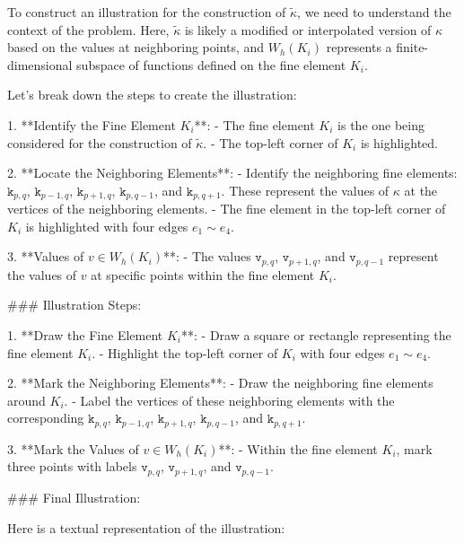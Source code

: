 To construct an illustration for the construction of \(\tilde{\kappa}\), we need to understand the context of the problem. Here, \(\tilde{\kappa}\) is likely a modified or interpolated version of \(\kappa\) based on the values at neighboring points, and \(W_h(K_i)\) represents a finite-dimensional subspace of functions defined on the fine element \(K_i\).

Let's break down the steps to create the illustration:

1. **Identify the Fine Element \(K_i\)**:
   - The fine element \(K_i\) is the one being considered for the construction of \(\tilde{\kappa}\).
   - The top-left corner of \(K_i\) is highlighted.

2. **Locate the Neighboring Elements**:
   - Identify the neighboring fine elements: \(\mathtt{k}_{p,q}\), \(\mathtt{k}_{p-1,q}\), \(\mathtt{k}_{p+1,q}\), \(\mathtt{k}_{p,q-1}\), and \(\mathtt{k}_{p,q+1}\). These represent the values of \(\kappa\) at the vertices of the neighboring elements.
   - The fine element in the top-left corner of \(K_i\) is highlighted with four edges \(e_1 \sim e_4\).

3. **Values of \(v \in W_h(K_i)\)**:
   - The values \(\mathtt{v}_{p,q}\), \(\mathtt{v}_{p+1,q}\), and \(\mathtt{v}_{p,q-1}\) represent the values of \(v\) at specific points within the fine element \(K_i\).

### Illustration Steps:

1. **Draw the Fine Element \(K_i\)**:
   - Draw a square or rectangle representing the fine element \(K_i\).
   - Highlight the top-left corner of \(K_i\) with four edges \(e_1 \sim e_4\).

2. **Mark the Neighboring Elements**:
   - Draw the neighboring fine elements around \(K_i\).
   - Label the vertices of these neighboring elements with the corresponding \(\mathtt{k}_{p,q}\), \(\mathtt{k}_{p-1,q}\), \(\mathtt{k}_{p+1,q}\), \(\mathtt{k}_{p,q-1}\), and \(\mathtt{k}_{p,q+1}\).

3. **Mark the Values of \(v \in W_h(K_i)\)**:
   - Within the fine element \(K_i\), mark three points with labels \(\mathtt{v}_{p,q}\), \(\mathtt{v}_{p+1,q}\), and \(\mathtt{v}_{p,q-1}\).

### Final Illustration:

Here is a textual representation of the illustration:

